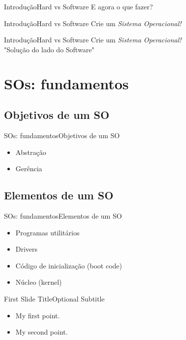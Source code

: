 \documentclass{beamer}
\begin{document}
\begin{frame}{Introdução}{Hard vs Software}
  E agora o que fazer?
\end{frame}

\begin{frame}{Introdução}{Hard vs Software}
  Crie um \emph{Sistema Operacional!}
\end{frame}

\begin{frame}{Introdução}{Hard vs Software}
  Crie um \emph{Sistema Operacional!}\\
  "Solução do lado do Software"
\end{frame}

\section{SOs: fundamentos}
\subsection{Objetivos de um SO}

\begin{frame}{SOs: fundamentos}{Objetivos de um SO}
  \begin{itemize}
  \item Abstração
  \item Gerência
  \end{itemize}
\end{frame}

\subsection{Elementos de um SO}

\begin{frame}{SOs: fundamentos}{Elementos de um SO}
  \begin{itemize}
  \item Programas utilitários
  \item Drivers
  \item Código de inicialização (boot code)
  \item Núcleo (kernel)
  \end{itemize}
\end{frame}


\begin{frame}{First Slide Title}{Optional Subtitle}
  \begin{itemize}
  \item {
    My first point.
  }
  \item {
    My second point.
  }
  \end{itemize}
\end{frame}
\end{document}
